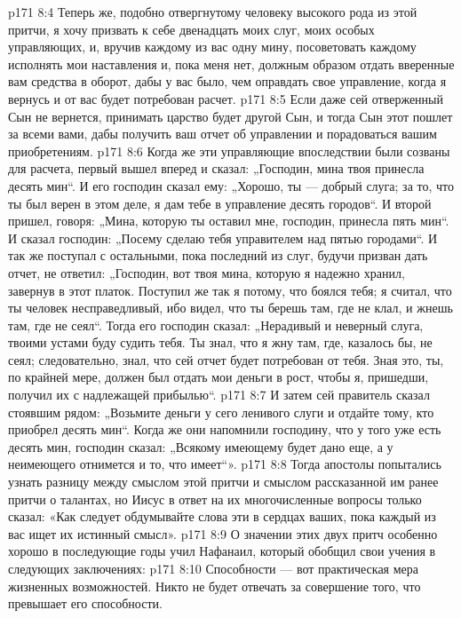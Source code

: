 \vs p171 8:4 Теперь же, подобно отвергнутому человеку высокого рода из этой притчи, я хочу призвать к себе двенадцать моих слуг, моих особых управляющих, и, вручив каждому из вас одну мину, посоветовать каждому исполнять мои наставления и, пока меня нет, должным образом отдать вверенные вам средства в оборот, дабы у вас было, чем оправдать свое управление, когда я вернусь и от вас будет потребован расчет.
\vs p171 8:5 Если даже сей отверженный Сын не вернется, принимать царство будет другой Сын, и тогда Сын этот пошлет за всеми вами, дабы получить ваш отчет об управлении и порадоваться вашим приобретениям.
\vs p171 8:6 Когда же эти управляющие впоследствии были созваны для расчета, первый вышел вперед и сказал: „Господин, мина твоя принесла десять мин“. И его господин сказал ему: „Хорошо, ты --- добрый слуга; за то, что ты был верен в этом деле, я дам тебе в управление десять городов“. И второй пришел, говоря: „Мина, которую ты оставил мне, господин, принесла пять мин“. И сказал господин: „Посему сделаю тебя управителем над пятью городами“. И так же поступал с остальными, пока последний из слуг, будучи призван дать отчет, не ответил: „Господин, вот твоя мина, которую я надежно хранил, завернув в этот платок. Поступил же так я потому, что боялся тебя; я считал, что ты человек несправедливый, ибо видел, что ты берешь там, где не клал, и жнешь там, где не сеял“. Тогда его господин сказал: „Нерадивый и неверный слуга, твоими устами буду судить тебя. Ты знал, что я жну там, где, казалось бы, не сеял; следовательно, знал, что сей отчет будет потребован от тебя. Зная это, ты, по крайней мере, должен был отдать мои деньги в рост, чтобы я, пришедши, получил их с надлежащей прибылью“.
\vs p171 8:7 И затем сей правитель сказал стоявшим рядом: „Возьмите деньги у сего ленивого слуги и отдайте тому, кто приобрел десять мин“. Когда же они напомнили господину, что у того уже есть десять мин, господин сказал: „Всякому имеющему будет дано еще, а у неимеющего отнимется и то, что имеет“».
\vs p171 8:8 \pc Тогда апостолы попытались узнать разницу между смыслом этой притчи и смыслом рассказанной им ранее притчи о талантах, но Иисус в ответ на их многочисленные вопросы только сказал: «Как следует обдумывайте слова эти в сердцах ваших, пока каждый из вас ищет их истинный смысл».
\vs p171 8:9 О значении этих двух притч особенно хорошо в последующие годы учил Нафанаил, который обобщил свои учения в следующих заключениях:
\vs p171 8:10 \bibnobreakspace Способности --- вот практическая мера жизненных возможностей. Никто не будет отвечать за совершение того, что превышает его способности.
